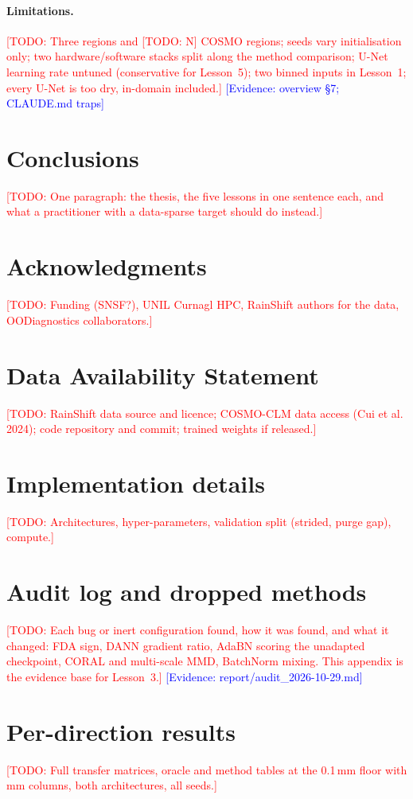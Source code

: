 \documentclass{article}
\newcommand{\todo}[1]{\textcolor{red}{[TODO: #1]}}
\newcommand{\ev}[1]{\textcolor{blue}{[Evidence: #1]}}
\begin{document}
\paragraph{Limitations.} \todo{Three regions and \todo{N} COSMO regions;
seeds vary initialisation only; two hardware/software stacks split along
the method comparison; U-Net learning rate untuned (conservative for
Lesson~5); two binned inputs in Lesson~1; every U-Net is too dry,
in-domain included.} \ev{overview \S7; CLAUDE.md traps}

\section{Conclusions}\label{sec:conclusions}
\todo{One paragraph: the thesis, the five lessons in one sentence each,
and what a practitioner with a data-sparse target should do instead.}

\section*{Acknowledgments}
\todo{Funding (SNSF?), UNIL Curnagl HPC, RainShift authors for the data,
OODiagnostics collaborators.}

\section*{Data Availability Statement}
\todo{RainShift data source and licence; COSMO-CLM data access (Cui et
al. 2024); code repository and commit; trained weights if released.}

\appendix

\section{Implementation details}\label{app:details}
\todo{Architectures, hyper-parameters, validation split (strided, purge
gap), compute.}

\section{Audit log and dropped methods}\label{app:audit}
\todo{Each bug or inert configuration found, how it was found, and what
it changed: FDA sign, DANN gradient ratio, AdaBN scoring the unadapted
checkpoint, CORAL and multi-scale MMD, BatchNorm mixing. This appendix is
the evidence base for Lesson~3.}
\ev{report/audit\_2026-10-29.md}

\section{Per-direction results}\label{app:tables}
\todo{Full transfer matrices, oracle and method tables at the 0.1\,mm
floor with mm columns, both architectures, all seeds.}



\end{document}
